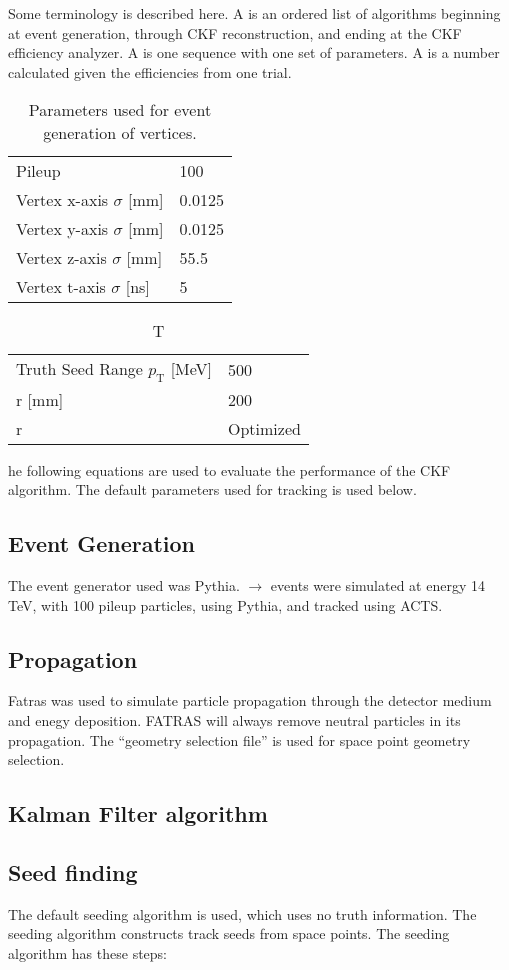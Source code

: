 \documentclass{article}
\newcommand{\pt}[0]{p_\textrm{T}}
\newcommand{\figtab}[3]{
\begin{table}[H]
\begin{tabular}{#1}
#2
\end{tabular}
\caption{#3}
\end{table}}
\begin{document}
Some terminology is described here. A  is an ordered list of algorithms beginning at event generation, through CKF reconstruction, and ending at the CKF efficiency analyzer. A  is one sequence with one set of parameters. A  is a number calculated given the efficiencies from one trial.

\figtab{l l}{Pileup & 100\\
Vertex x-axis $\sigma$ [mm] & 0.0125\\
Vertex y-axis $\sigma$ [mm] & 0.0125\\
Vertex z-axis $\sigma$ [mm] & 55.5\\
Vertex t-axis $\sigma$ [ns] & 5}{Parameters used for event generation of vertices.}

\figtab{l l}{Truth Seed Range $\pt$ [MeV] & 500\\
r [mm] & 200\\
\Delta r & Optimized}

The following equations are used to evaluate the performance of the CKF algorithm. The default parameters used for tracking is used below.

\subsection{Event Generation}

The event generator used was Pythia. \qqbar $\rightarrow$ \ttbar events were simulated at energy 14 TeV, with 100 pileup particles, using Pythia, and tracked using ACTS.

\subsection{Propagation}

Fatras was used to simulate particle propagation through the detector medium and enegy deposition. FATRAS will always remove neutral particles in its propagation. The ``geometry selection file'' is used for space point geometry selection.

\subsection{Kalman Filter algorithm}

\subsection{Seed finding}

The default seeding algorithm is used, which uses no truth information. The seeding algorithm constructs track seeds from space points. The seeding algorithm has these steps:
\end{document}
